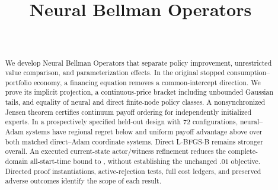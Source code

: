 \documentclass[ecta]{econsocart}
\theoremstyle{remark}
\begin{document}
\begin{frontmatter}
\title{Neural Bellman Operators}
\begin{aug}
\author[id=au1,addressref={add1}]{~}
\address[id=add1]{}
\end{aug}
\begin{abstract}We develop Neural Bellman Operators that separate policy improvement, unrestricted value comparison, and parameterization effects. In the original stopped consumption--portfolio economy, a financing equation removes a common-intercept direction. We prove its implicit projection, a continuous-price bracket including unbounded Gaussian tails, and equality of neural and direct finite-node policy classes. A nonsynchronized Jensen theorem certifies continuum payoff ordering for independently initialized experts. In a prospectively specified held-out design with 72 configurations, neural--Adam systems have regional regret below \RXXIIINeuralRegret{} and uniform payoff advantage above \RXXIIIConditionalGain{} over both matched direct--Adam coordinate systems. Direct L-BFGS-B remains stronger overall. An executed current-state actor/witness refinement reduces the complete-domain all-start-time bound to \RXXIIGlobalBound{}, without establishing the unchanged $.01$ objective. Directed proof instantiations, active-rejection tests, full cost ledgers, and preserved adverse outcomes identify the scope of each result.\end{abstract}
\begin{keyword}
\end{keyword}
\end{frontmatter}







\begin{appendix}








\end{appendix}
\clearpage
\end{document}
